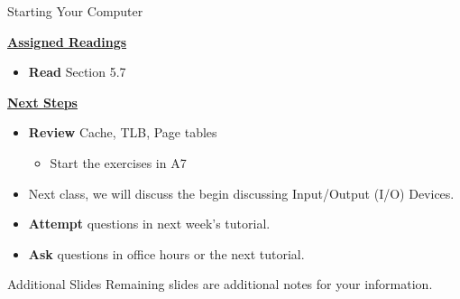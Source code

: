 \begin{Lecture}{Starting Your Computer}
\begin{frame}[fragile]
 \underline{\textbf{Assigned Readings}}
\begin{itemize}
   \item \textbf{Read} Section 5.7
     \end{itemize}
    \underline{\textbf{Next Steps}}
    \begin{itemize}
     \item \textbf{Review} Cache, TLB, Page tables
\begin{itemize}
    \item Start the exercises in A7
\end{itemize}
\item Next class, we will discuss the begin discussing Input/Output (I/O) Devices. 
\item \textbf{Attempt} questions in next week's tutorial. 
    \item \textbf{Ask} questions in office hours or the next tutorial.
 \end{itemize}

\end{frame}

 \begin{frame}{Additional Slides}
     Remaining slides are additional notes for your information.
 \end{frame}


\end{Lecture}
\fi
